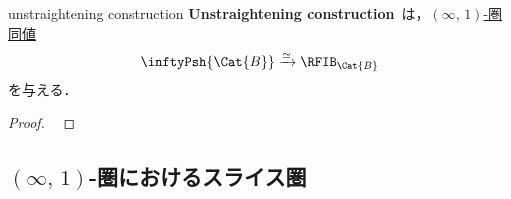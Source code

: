 \documentclass[TQFT_main]{subfiles}
\begin{document}
\begin{mytheo}[label=thm:unstraightening]{unstraightening construction}
    \textbf{Unstraightening construction}~\cite[Theorem 2.2.1.2.]{lurie2008higher}は，\hyperref[def:equiv-infty]{$(\infty,\, 1)$-圏同値}
    \begin{align}
        \inftyPsh{\Cat{B}} \xrightarrow{\simeq} \RFIB_{\Cat{B}}
    \end{align}
    を与える．
\end{mytheo}

\begin{proof}
    ~\cite[Proposition 2.2.3.11]{lurie2008higher}
\end{proof}

\subsection{{$(\infty,\, 1)$}-圏におけるスライス圏}
\end{document}
